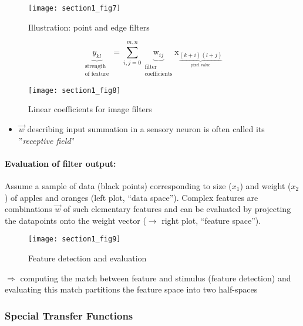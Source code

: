 \begin{figure}[h]
  \centering
\texttt{[image: section1\_fig7]}   
  \caption{Illustration: point and edge filters}
\end{figure}


\begin{equation}
	\underbrace{y_{kl}}_{
		\substack{\text{strength} \\ \text{of feature}}} 
		= \sum_{i,j = 0}^{m,n} 
			\underbrace{\mathrm{w}_{ij}}_{
				\substack{\text{filter} \\ \text{coefficients}}}
		\mathrm{x}_{\underbrace{(k+i)(l+j)}_{\text{pixel value}}}
\end{equation}

\begin{figure}[h]
  \centering
\texttt{[image: section1\_fig8]}  
  \caption{Linear coefficients for image filters}
\end{figure}


\begin{itemize}
\item $\vec{w}$ describing input summation in a sensory neuron is
often called its ''\emph{receptive field}''
\end{itemize}
\vspace{5mm}

\paragraph{Evaluation of filter output:} \label{sec:eval-filt-outp}
Assume a sample of data (black points) corresponding to size ($x_1$)
and weight ($x_2$) of apples and oranges (left plot, ``data
space''). Complex features are combinations $\vec{w}$ of such
elementary features and can be evaluated by projecting the datapoints
onto the weight vector ($\rightarrow$ right plot, ``feature space'').


\begin{figure}[h]
  \centering
\texttt{[image: section1\_fig9]}   
  \caption{Feature detection and evaluation}
\end{figure}


$\Rightarrow$ computing the match between feature and stimulus
(feature detection) and evaluating this match partitions the feature space into two half-spaces


\subsubsection{Special Transfer Functions}
